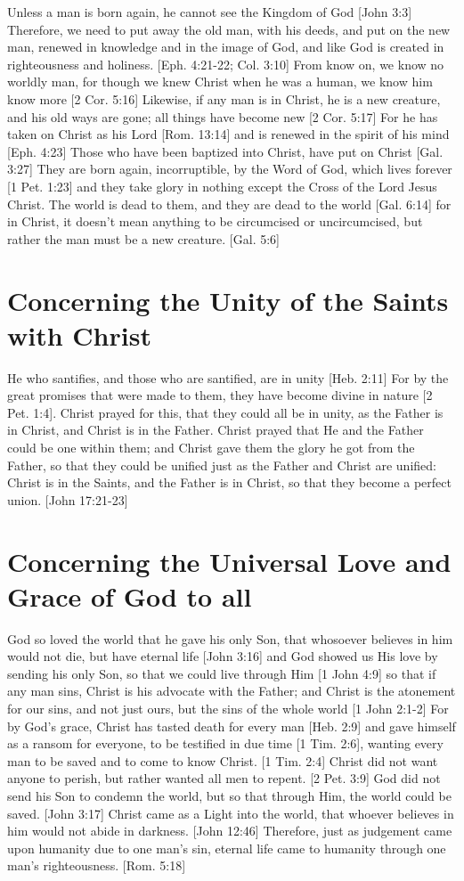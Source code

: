 \documentclass[../main.tex]{subfiles}
\begin{document}
	Unless a man is born again, he cannot see the Kingdom of God [John 3:3] Therefore, we need to put away the old man, with his deeds, and put on the new man, renewed in knowledge and in the image of God, and like God is created in righteousness and holiness. [Eph. 4:21-22; Col. 3:10] From know on, we know no worldly man, for though we knew Christ when he was a human, we know him know more [2 Cor. 5:16] Likewise, if any man is in Christ, he is a new creature, and his old ways are gone; all things have become new [2 Cor. 5:17] For he has taken on Christ as his Lord [Rom. 13:14] and is renewed in the spirit of his mind [Eph. 4:23] Those who have been baptized into Christ, have put on Christ [Gal. 3:27] They are born again, incorruptible, by the Word of God, which lives forever [1 Pet. 1:23] and they take glory in nothing except the Cross of the Lord Jesus Christ. The world is dead to them, and they are dead to the world [Gal. 6:14] for in Christ, it doesn't mean anything to be circumcised or uncircumcised, but rather the man must be a new creature. [Gal. 5:6]

	\section{Concerning the Unity of the Saints with Christ}

	He who santifies, and those who are santified, are in unity [Heb. 2:11] For by the great promises that were made to them, they have become divine in nature [2 Pet. 1:4]. Christ prayed for this, that they could all be in unity, as the Father is in Christ, and Christ is in the Father. Christ prayed that He and the Father could be one within them; and Christ gave them the glory he got from the Father, so that they could be unified just as the Father and Christ are unified: Christ is in the Saints, and the Father is in Christ, so that they become a perfect union. [John 17:21-23]

	\section{Concerning the Universal Love and Grace of God to all}

	God so loved the world that he gave his only Son, that whosoever believes in him would not die, but have eternal life [John 3:16] and God showed us His love by sending his only Son, so that we could live through Him [1 John 4:9] so that if any man sins, Christ is his advocate with the Father; and Christ is the atonement for our sins, and not just ours, but the sins of the whole world [1 John 2:1-2] For by God's grace, Christ has tasted death for every man [Heb. 2:9] and gave himself as a ransom for everyone, to be testified in due time [1 Tim. 2:6], wanting every man to be saved and to come to know Christ. [1 Tim. 2:4] Christ did not want anyone to perish, but rather wanted all men to repent. [2 Pet. 3:9] God did not send his Son to condemn the world, but so that through Him, the world could be saved. [John 3:17] Christ came as a Light into the world, that whoever believes in him would not abide in darkness. [John 12:46] Therefore, just as judgement came upon humanity due to one man's sin, eternal life came to humanity through one man's righteousness. [Rom. 5:18]
\end{document}
